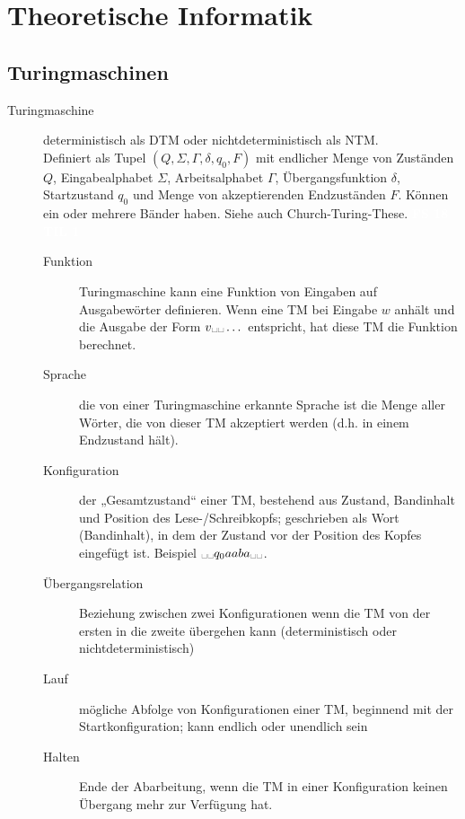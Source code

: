 \documentclass[a4paper,10pt]{article}
\newcommand{\vl}[1]{\colorbox{vl}{\textcolor{white}{\small\textbf{#1}}}}
\newcommand{\blank}{\text{\textvisiblespace}}
\begin{document}
    \newpage
    \section{Theoretische Informatik}
    \subsection{Turingmaschinen}
    \begin{description}
        \item[Turingmaschine] deterministisch als DTM oder nichtdeterministisch als NTM. \\
            Definiert als Tupel $(Q,\Sigma,\Gamma,\delta,q_0,F)$ mit endlicher Menge von Zuständen $Q$, Eingabealphabet $\Sigma$, Arbeitsalphabet $\Gamma$, Übergangsfunktion $\delta$, Startzustand $q_0$ und Menge von akzeptierenden Endzuständen $F$. Können ein oder mehrere Bänder haben. Siehe auch Church-Turing-These. \vl{FS 18} \vl{TIL 1}

            \begin{description}
                \item[Funktion] Turingmaschine kann eine Funktion von Eingaben auf Ausgabewörter definieren. Wenn eine TM bei Eingabe $w$ anhält und die Ausgabe der Form $v\blank\blank\dots$ entspricht, hat diese TM die Funktion berechnet.
                \item[Sprache] die von einer Turingmaschine erkannte Sprache ist die Menge aller Wörter, die von dieser TM akzeptiert werden (d.h. in einem Endzustand hält).

                \item[Konfiguration]
                    der „Gesamtzustand“ einer TM, bestehend aus Zustand, Bandinhalt und Position des Lese-/Schreibkopfs;
                    geschrieben als Wort (Bandinhalt), in dem der Zustand vor der Position des Kopfes eingefügt ist. Beispiel $ \blank\blank q_0aaba \blank\blank$.
                \item[Übergangsrelation]
                    Beziehung zwischen zwei Konfigurationen wenn die TM von der ersten in die zweite übergehen kann
                    (deterministisch oder nichtdeterministisch)
                \item[Lauf] mögliche Abfolge von Konfigurationen einer TM, beginnend mit der Startkonfiguration; kann endlich oder unendlich sein
                \item[Halten] Ende der Abarbeitung, wenn die TM in einer Konfiguration keinen Übergang mehr zur Verfügung hat.


\end{description}
\end{description}
\end{document}
